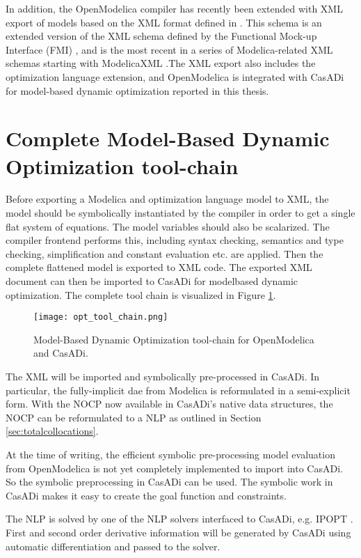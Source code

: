 In addition, the OpenModelica compiler has recently been extended with XML export of models \cite{alachew} based on the XML
format defined in \cite{xml}. This schema is an extended version of the XML schema
defined by the Functional Mock-up Interface (FMI) \cite{fmi}, and is the most recent in a series of
Modelica-related XML schemas starting with ModelicaXML \cite{pop}.The XML export also includes the
optimization language extension, and OpenModelica is integrated with CasADi for model-based dynamic optimization reported in this thesis.

\section{Complete Model-Based Dynamic Optimization tool-chain}
\label{sec:optimizationtoolchain}

Before exporting a Modelica and optimization language model to XML, the model should be symbolically
instantiated by the compiler in order to get a single flat system of equations. The model variables should also be
scalarized. The compiler frontend performs this, including syntax checking, semantics and type checking, simplification
and constant evaluation etc. are applied. Then the complete flattened model is exported to XML code. The exported
XML document can then be imported to CasADi for modelbased dynamic optimization. The complete tool chain is
visualized in Figure \ref{fig:optimizationtoolchain}.

\begin{figure}
	\texttt{[image: opt\_tool\_chain.png]}
	\caption{Model-Based Dynamic Optimization tool-chain for OpenModelica and CasADi.}
	\label{fig:optimizationtoolchain}
\end{figure}

The XML will be imported and symbolically pre-processed in CasADi. In particular, the fully-implicit \acrshort{dae} from
Modelica is reformulated in a semi-explicit form. With the NOCP now available in CasADi’s native data structures, the
NOCP can be reformulated to a NLP as outlined in Section \ref{sec:totalcollocations}.

At the time of writing, the efficient symbolic pre-processing model evaluation from OpenModelica is not yet completely
implemented to import into CasADi. So the symbolic preprocessing in CasADi can be used. The symbolic work in CasADi makes it easy to create the goal function and constraints.

The NLP is solved by one of the NLP solvers interfaced to CasADi, e.g. IPOPT \cite{wachter}. First and second order derivative information will be generated by CasADi using automatic differentiation and passed to the solver.

